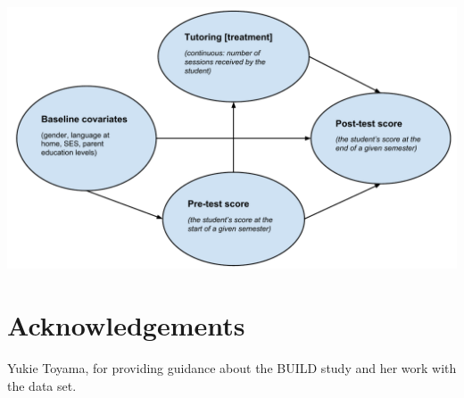 \documentclass[a0,landscape]{a0poster}
\begin{document}
\begin{multicols}{3}
\color{DarkSlateGray} %

\begin{center}\vspace{1cm}
\includegraphics[width=0.8\linewidth]{LongitData-DAG.pdf}
\end{center}\vspace{-1.5cm}


\section*{Acknowledgements}

Yukie Toyama, for providing guidance about the BUILD study and her work with the data set.


\end{multicols}
\end{document}

